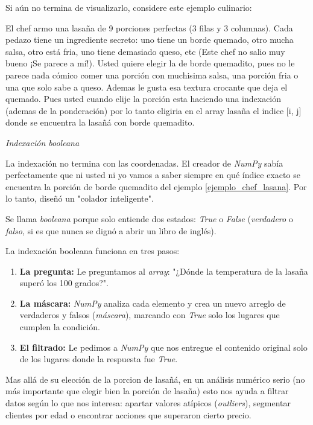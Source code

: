 Si aún no termina de visualizarlo, considere este ejemplo culinario: 
\begin{ejemplo}
    \label{ejemplo_chef_lasana}
    El chef armo una lasaña de 9 porciones perfectas (3 filas y 3 columnas). Cada pedazo tiene un ingrediente secreto: uno tiene un borde quemado, otro mucha salsa, otro está fria, uno tiene demasiado queso, etc (Este chef no salio muy bueno ¡Se parece a mí!). Usted quiere elegir la de borde quemadito, pues no le parece nada cómico comer una porción con muchisima salsa, una porción fria o una que solo sabe a queso. Ademas le gusta esa textura crocante que deja el quemado. Pues usted cuando elije la porción esta haciendo una indexación (ademas de la ponderación) por lo tanto eligiria en el array lasaña el indice [i, j] donde se encuentra la lasañá con borde quemadito.
\end{ejemplo}

\emph{Indexación booleana}

La indexación no termina con las coordenadas. El creador de \textit{NumPy} sabía perfectamente que ni usted ni yo vamos a saber siempre en qué índice exacto se encuentra la porción de borde quemadito del ejemplo \ref{ejemplo_chef_lasana}. Por lo tanto, diseñó un "colador inteligente".

Se llama \textit{booleana} porque solo entiende dos estados: \textit{True} o \textit{False} (\textit{verdadero} o \textit{falso}, si es que nunca se dignó a abrir un libro de inglés).

La indexación booleana funciona en tres pasos:
\begin{enumerate}
\item \textbf{La pregunta:} Le preguntamos al \textit{array}: "¿Dónde la temperatura de la lasaña superó los 100 grados?".
\item \textbf{La máscara:} \textit{NumPy} analiza cada elemento y crea un nuevo arreglo de verdaderos y falsos (\textit{máscara}), marcando con \textit{True} solo los lugares que cumplen la condición.
\item \textbf{El filtrado:} Le pedimos a \textit{NumPy} que nos entregue el contenido original solo de los lugares donde la respuesta fue \textit{True}.
\end{enumerate}

Mas allá de su elección de la porcion de lasañá, en un análisis numérico serio (no más importante que elegir bien la porción de lasaña) esto nos ayuda a filtrar datos según lo que nos interesa: apartar valores atípicos (\textit{outliers}), segmentar clientes por edad o encontrar acciones que superaron cierto precio.

